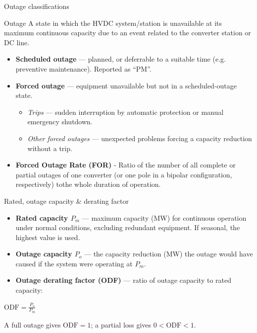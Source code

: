 
\begin{frame}{Outage classifications}
  \begin{block}{Outage}
    A state in which the HVDC system/station is unavailable at its maximum
    continuous capacity due to an event related to the converter station
    or DC line.
  \end{block}
  \vspace{0.3em}
  \begin{itemize}
    \setlength{\itemsep}{0.5em}
    \item \textbf{Scheduled outage} — planned, or deferrable to a suitable
          time (e.g. preventive maintenance). Reported as ``PM''.
    \item \textbf{Forced outage} — equipment unavailable but not in a scheduled-outage state.
      \begin{itemize}
        \item \emph{Trips} — sudden interruption by automatic protection or manual emergency shutdown.
        \item \emph{Other forced outages} — unexpected problems forcing a capacity reduction without a trip.
      \end{itemize}
    \item \textbf{Forced Outage Rate (FOR)} - Ratio of the number of all complete or partial outages of one converter 
    (or one pole in a bipolar configuration, respectively) tothe whole duration of operation.
  \end{itemize}
\end{frame}

\begin{frame}{Rated, outage capacity \& derating factor}
  \begin{itemize}
    \setlength{\itemsep}{0.5em}
    \item \textbf{Rated capacity $P_m$} — maximum capacity (MW) for continuous operation under normal conditions, excluding redundant equipment.
          If seasonal, the highest value is used.
    \item \textbf{Outage capacity $P_o$} — the capacity reduction (MW) the outage would have caused if the system were operating at $P_m$.
    \item \textbf{Outage derating factor (ODF)} — ratio of outage capacity to rated capacity:
  \end{itemize}
  \vspace{0.4em}
  {\centering\large $\displaystyle \mathrm{ODF} = \frac{P_o}{P_m}$ \par}
  \vspace{0.3em}
  \centering
  {\color{atGray}\footnotesize A full outage gives $\mathrm{ODF}=1$; a partial loss gives $0<\mathrm{ODF}<1$.}
\end{frame}

